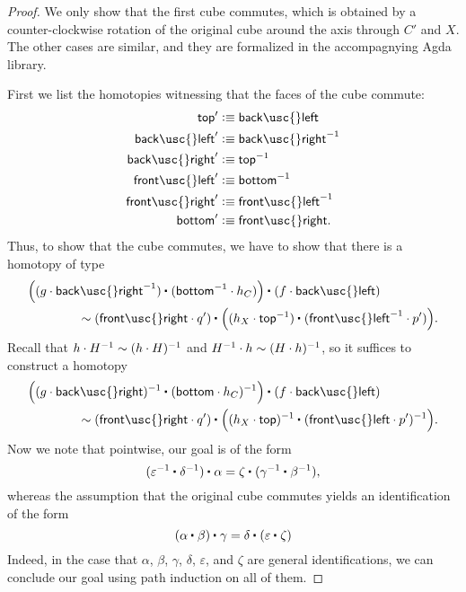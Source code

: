 \begin{proof}
  We only show that the first cube commutes, which is obtained by a counter-clockwise rotation of the original cube around the axis through $C'$ and $X$. The other cases are similar, and they are formalized in the accompagnying Agda library.

  First we list the homotopies witnessing that the faces of the cube commute:
  \begin{align*}
    \mathsf{top}' & \defeq \mathsf{back\usc{}left} \\
    \mathsf{back\usc{}left}' & \defeq \mathsf{back\usc{}right}^{-1} \\
    \mathsf{back\usc{}right}' & \defeq \mathsf{top}^{-1} \\
    \mathsf{front\usc{}left}' & \defeq \mathsf{bottom}^{-1} \\
    \mathsf{front\usc{}right}' & \defeq \mathsf{front\usc{}left}^{-1} \\
    \mathsf{bottom}' & \defeq \mathsf{front\usc{}right}. 
  \end{align*}
  Thus, to show that the cube commutes, we have to show that there is a homotopy of type
  \begin{align*}
    & \ct{\Big(\ct{(g \cdot \mathsf{back\usc{}right}^{-1})}{(\mathsf{bottom}^{-1}\cdot h_C)}\Big)}{(f \cdot \mathsf{back\usc{}left})} \\
    & \qquad\qquad \htpy \ct{(\mathsf{front\usc{}right}\cdot q')}{\Big(\ct{(h_X \cdot \mathsf{top}^{-1})}{(\mathsf{front\usc{}left}^{-1}\cdot p')}\Big)}.
  \end{align*}
  Recall that $h\cdot H^{-1}\sim (h\cdot H)^{-1}$ and $H^{-1}\cdot h\sim (H\cdot h)^{-1}$, so it suffices to construct a homotopy
  \begin{align*}
    & \ct{\Big(\ct{(g \cdot \mathsf{back\usc{}right})^{-1}}{(\mathsf{bottom}\cdot h_C)^{-1}}\Big)}{(f \cdot \mathsf{back\usc{}left})} \\
    & \qquad\qquad \htpy \ct{(\mathsf{front\usc{}right}\cdot q')}{\Big(\ct{(h_X \cdot \mathsf{top})^{-1}}{(\mathsf{front\usc{}left}\cdot p')^{-1}}\Big)}.
  \end{align*}
  Now we note that pointwise, our goal is of the form
  \begin{equation*}
    \ct{(\ct{\varepsilon^{-1}}{\delta^{-1}})}{\alpha}=\ct{\zeta}{(\ct{\gamma^{-1}}{\beta^{-1}})}, %
  \end{equation*}
  whereas the assumption that the original cube commutes yields an identification of the form
  \begin{equation*}
    \ct{(\ct{\alpha}{\beta})}{\gamma}=\ct{\delta}{(\ct{\varepsilon}{\zeta})}
  \end{equation*}
  Indeed, in the case that $\alpha$, $\beta$, $\gamma$, $\delta$, $\varepsilon$, and $\zeta$ are general identifications, we can conclude our goal using path induction on all of them.
\end{proof}

